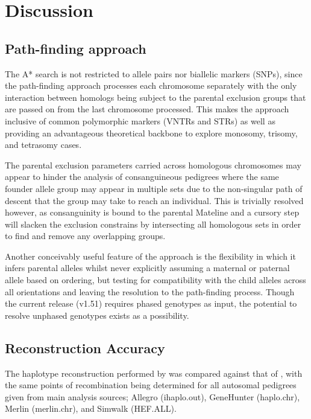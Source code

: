 \section{Discussion}

\subsection{Path-finding approach}

The A* search is not restricted to allele pairs nor biallelic markers (SNPs), since the path-finding approach processes each chromosome separately with the only interaction between homologs being subject to the parental exclusion groups that are passed on from the last chromosome processed. This makes the approach inclusive of common polymorphic markers (VNTRs and STRs) as well as providing an advantageous theoretical backbone to explore monosomy, trisomy, and tetrasomy cases.

The parental exclusion parameters carried across homologous chromosomes may appear to hinder the analysis of consanguineous pedigrees where the same founder allele group may appear in multiple sets due to the non-singular path of descent that the group may take to reach an individual. This is trivially resolved however, as consanguinity is bound to the parental Mateline and a cursory step will slacken the exclusion constrains by intersecting all homologous sets in order to find and remove any overlapping groups.

Another conceivably useful feature of the approach is the flexibility in which it infers parental alleles whilst never explicitly assuming a maternal or paternal allele based on ordering, but testing for compatibility with the child alleles across all orientations and leaving the resolution to the path-finding process. Though the current \app release (v1.51) requires phased genotypes as input, the potential to resolve unphased genotypes exists as a possibility.


\subsection{Reconstruction Accuracy}

The haplotype reconstruction performed by \app was compared against that of \app, with the same points of recombination being determined for all autosomal pedigrees given from main analysis sources; Allegro (ihaplo.out), GeneHunter (haplo.chr), Merlin (merlin.chr), and Simwalk (HEF.ALL).

